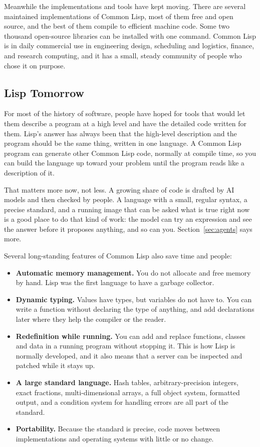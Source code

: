 Meanwhile the implementations and tools have kept moving. There are
several maintained implementations of Common Lisp, most of them free
and open source, and the best of them compile to efficient machine
code. Some two thousand
open-source libraries can be installed with one command. Common Lisp
is in daily commercial use in engineering design, scheduling and
logistics, finance, and research computing, and it has a small, steady
community of people who chose it on purpose.

\subsection{Lisp Tomorrow}

For most of the history of software, people have hoped for tools that
would let them describe a program at a high level and have the detailed
code written for them. Lisp's answer has always been that the
high-level description and the program should be the same thing,
written in one language. A Common Lisp program can generate other
Common Lisp code, normally at compile time, so you can build the
language up toward your problem until the program reads like a
description of it.

That matters more now, not less. A growing share of code is drafted by
AI models and then checked by people. A language with a small, regular
syntax, a precise standard, and a running image that can be asked what
is true right now is a good place to do that kind of work: the model
can try an expression and see the answer before it proposes anything,
and so can you. Section~\ref{sec:agents} says more.

Several long-standing features of Common Lisp also save time and
people:

\begin{itemize}
\item \textbf{Automatic memory management.} You do not
allocate and free memory by hand. Lisp was the first language to have
a garbage collector.

\item \textbf{Dynamic typing.} Values have types, but variables
do not have to. You can write a function without declaring the type
of anything, and add declarations later where they help the compiler
or the reader.

\item \textbf{Redefinition while running.} You can add and replace
functions, classes and data in a running program without stopping it.
This is how Lisp is normally developed, and it also means that a
server can be inspected and patched while it stays up.

\item \textbf{A large standard language.} Hash tables, arbitrary-precision
integers, exact fractions, multi-dimensional arrays, a full object
system, formatted output, and a condition system for handling errors
are all part of the standard.

\item \textbf{Portability.} Because the standard is precise, code moves
between implementations and operating systems with little or no
change.
\end{itemize}


